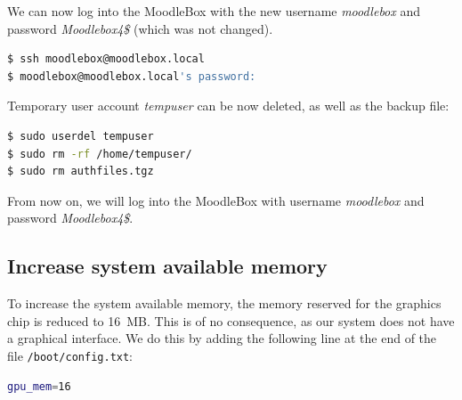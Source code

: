 \documentclass[12pt]{article}
\begin{document}
We can now log into the MoodleBox with the new username \emph{moodlebox} and password \emph{Moodlebox4\$} (which was not changed).
\begin{lstlisting}[language=bash]
$ ssh moodlebox@moodlebox.local
$ moodlebox@moodlebox.local's password:
\end{lstlisting}

Temporary user account \emph{tempuser} can be now deleted, as well as the backup file:
\begin{lstlisting}[language=bash]
$ sudo userdel tempuser
$ sudo rm -rf /home/tempuser/
$ sudo rm authfiles.tgz
\end{lstlisting}

From now on, we will log into the MoodleBox with username \emph{moodlebox} and password \emph{Moodlebox4\$}.

\subsection{Increase system available memory}

To increase the system available memory, the memory reserved for the graphics chip is reduced to 16~MB.
This is of no consequence, as our system does not have a graphical interface.
We do this by adding the following line at the end of the file \lstinline{/boot/config.txt}:
\begin{lstlisting}[language=bash]
gpu_mem=16
\end{lstlisting}
\end{document}
